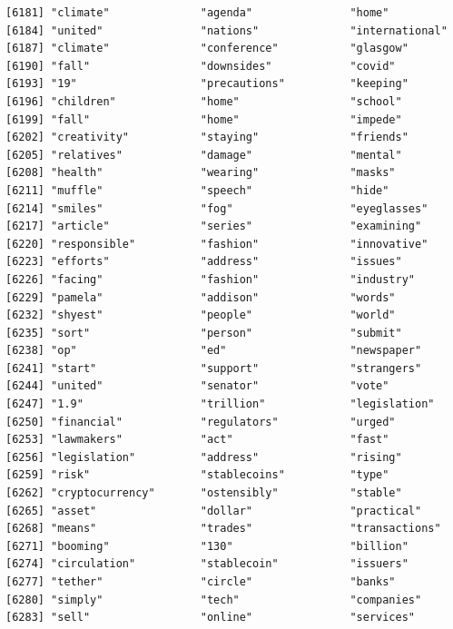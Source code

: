\documentclass[
  letterpaper,
  DIV=11,
  numbers=noendperiod]{scrartcl}
\begin{document}
\begin{verbatim}
[6181] "climate"              "agenda"               "home"                
[6184] "united"               "nations"              "international"       
[6187] "climate"              "conference"           "glasgow"             
[6190] "fall"                 "downsides"            "covid"               
[6193] "19"                   "precautions"          "keeping"             
[6196] "children"             "home"                 "school"              
[6199] "fall"                 "home"                 "impede"              
[6202] "creativity"           "staying"              "friends"             
[6205] "relatives"            "damage"               "mental"              
[6208] "health"               "wearing"              "masks"               
[6211] "muffle"               "speech"               "hide"                
[6214] "smiles"               "fog"                  "eyeglasses"          
[6217] "article"              "series"               "examining"           
[6220] "responsible"          "fashion"              "innovative"          
[6223] "efforts"              "address"              "issues"              
[6226] "facing"               "fashion"              "industry"            
[6229] "pamela"               "addison"              "words"               
[6232] "shyest"               "people"               "world"               
[6235] "sort"                 "person"               "submit"              
[6238] "op"                   "ed"                   "newspaper"           
[6241] "start"                "support"              "strangers"           
[6244] "united"               "senator"              "vote"                
[6247] "1.9"                  "trillion"             "legislation"         
[6250] "financial"            "regulators"           "urged"               
[6253] "lawmakers"            "act"                  "fast"                
[6256] "legislation"          "address"              "rising"              
[6259] "risk"                 "stablecoins"          "type"                
[6262] "cryptocurrency"       "ostensibly"           "stable"              
[6265] "asset"                "dollar"               "practical"           
[6268] "means"                "trades"               "transactions"        
[6271] "booming"              "130"                  "billion"             
[6274] "circulation"          "stablecoin"           "issuers"             
[6277] "tether"               "circle"               "banks"               
[6280] "simply"               "tech"                 "companies"           
[6283] "sell"                 "online"               "services"            

\end{verbatim}
\end{document}
